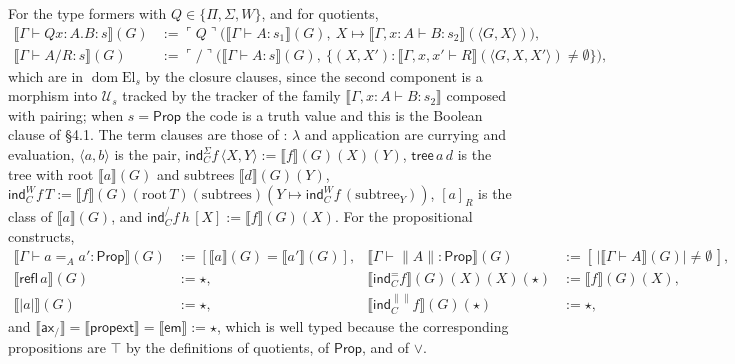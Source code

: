 \documentclass[10pt]{article}
\newcommand{\Prop}{\mathsf{Prop}}
\newcommand{\code}[1]{\ulcorner #1\urcorner}
\newcommand{\El}{\mathrm{El}}
\newcommand{\dom}{\operatorname{dom}}
\newcommand{\U}{\mathcal{U}}
\newcommand{\sem}[1]{\llbracket #1\rrbracket}
\begin{document}
For the type formers with $Q\in\{\Pi,\Sigma,W\}$, and for quotients,
\begin{align*}
\sem{\Gamma\vdash Qx{:}A.B:s}(G)&:=\code Q\bigl(\sem{\Gamma\vdash A:s_1}(G),\ X\mapsto\sem{\Gamma,x{:}A\vdash B:s_2}(\langle G,X\rangle)\bigr),\\
\sem{\Gamma\vdash A/R:s}(G)&:=\code/\bigl(\sem{\Gamma\vdash A:s}(G),\ \{(X,X'):\sem{\Gamma,x,x'\vdash R}(\langle G,X,X'\rangle)\ne\emptyset\}\bigr),
\end{align*}
which are in $\dom\El_s$ by the closure clauses, since the second
component is a morphism into $\U_s$ tracked by the tracker of the family
$\sem{\Gamma,x{:}A\vdash B:s_2}$ composed with pairing; when $s=\Prop$ the
code is a truth value and this is the Boolean clause of \S4.1. The term
clauses are those of \cite[App.~B]{vdbergotten23}: $\lambda$ and
application are currying and evaluation, $\langle a,b\rangle$ is the pair,
$\mathsf{ind}^\Sigma_C f\,\langle X,Y\rangle:=\sem f(G)(X)(Y)$,
$\mathsf{tree}\,a\,d$ is the tree with root $\sem a(G)$ and subtrees
$\sem d(G)(Y)$, $\mathsf{ind}^W_C f\,T:=\sem f(G)(\mathrm{root}\,T)
(\text{subtrees})(Y\mapsto\mathsf{ind}^W_C f\,(\text{subtree}_Y))$,
$[a]_R$ is the class of $\sem a(G)$, and $\mathsf{ind}^/_C f\,h\,[X]:=
\sem f(G)(X)$. For the propositional constructs,
\begin{align*}
\sem{\Gamma\vdash a=_A a':\Prop}(G)&:=[\sem a(G)=\sem{a'}(G)], &
\sem{\Gamma\vdash\|A\|:\Prop}(G)&:=[\,|\sem{\Gamma\vdash A}(G)|\ne\emptyset\,],\\
\sem{\mathsf{refl}\,a}(G)&:=\star, &
\sem{\mathsf{ind}^=_C f}(G)(X)(X)(\star)&:=\sem f(G)(X),\\
\sem{|a|}(G)&:=\star, &
\sem{\mathsf{ind}^{\|\|}_C f}(G)(\star)&:=\star,
\end{align*}
and $\sem{\mathsf{ax}_/}=\sem{\mathsf{propext}}=\sem{\mathsf{em}}:=\star$,
which is well typed because the corresponding propositions are $\top$ by
the definitions of quotients, of $\Prop$, and of $\vee$.
\end{document}
